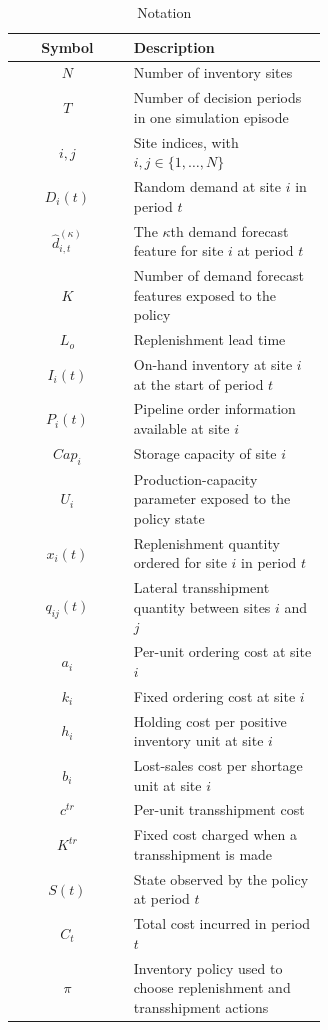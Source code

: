 \documentclass[journal]{IEEEtran}
\begin{document}
\begin{table}[t]
\centering
\footnotesize
\caption{Notation}
\label{table:notations}
\begin{tabular}{c|p{0.62\linewidth}}
\hline
\textbf{Symbol} & \textbf{Description} \\ \hline
$N$ & Number of inventory sites \\
$T$ & Number of decision periods in one simulation episode \\
$i,j$ & Site indices, with $i,j\in\{1,\ldots,N\}$ \\
$D_i(t)$ & Random demand at site $i$ in period $t$ \\
$\hat{d}^{(\kappa)}_{i,t}$ & The $\kappa$th demand forecast feature for site $i$ at period $t$ \\
$K$ & Number of demand forecast features exposed to the policy \\
$L_o$ & Replenishment lead time \\
$I_i(t)$ & On-hand inventory at site $i$ at the start of period $t$ \\
$P_i(t)$ & Pipeline order information available at site $i$ \\
$Cap_i$ & Storage capacity of site $i$ \\
$U_i$ & Production-capacity parameter exposed to the policy state \\
$x_i(t)$ & Replenishment quantity ordered for site $i$ in period $t$ \\
$q_{ij}(t)$ & Lateral transshipment quantity between sites $i$ and $j$ \\
$a_i$ & Per-unit ordering cost at site $i$ \\
$k_i$ & Fixed ordering cost at site $i$ \\
$h_i$ & Holding cost per positive inventory unit at site $i$ \\
$b_i$ & Lost-sales cost per shortage unit at site $i$ \\
$c^{tr}$ & Per-unit transshipment cost \\
$K^{tr}$ & Fixed cost charged when a transshipment is made \\
$S(t)$ & State observed by the policy at period $t$ \\
$C_t$ & Total cost incurred in period $t$ \\
$\pi$ & Inventory policy used to choose replenishment and transshipment actions \\ \hline
\end{tabular}
\end{table}
\end{document}
